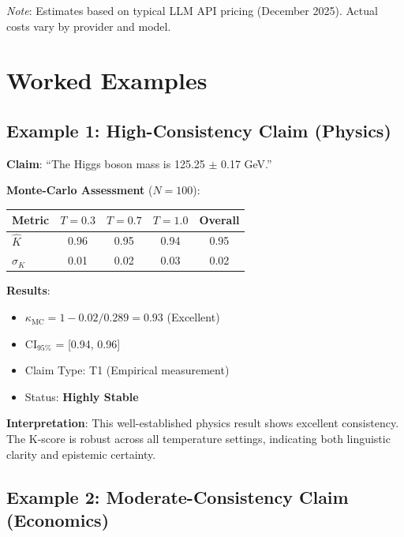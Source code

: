 \documentclass[11pt,a4paper]{article}
\theoremstyle{remark}
\begin{document}
\textit{Note}: Estimates based on typical LLM API pricing (December 2025). Actual costs vary by provider and model.


\section{Worked Examples}
\label{sec:examples}

\subsection{Example 1: High-Consistency Claim (Physics)}

\begin{examplebox}[title={Higgs Boson Mass}]
\textbf{Claim}: ``The Higgs boson mass is 125.25 $\pm$ 0.17 GeV.''

\textbf{Monte-Carlo Assessment} ($N = 100$):
\begin{center}
\begin{tabular}{lcccc}
\toprule
\textbf{Metric} & \textbf{$T=0.3$} & \textbf{$T=0.7$} & \textbf{$T=1.0$} & \textbf{Overall} \\
\midrule
$\hat{K}$ & 0.96 & 0.95 & 0.94 & 0.95 \\
$\sigma_K$ & 0.01 & 0.02 & 0.03 & 0.02 \\
\bottomrule
\end{tabular}
\end{center}

\textbf{Results}:
\begin{itemize}
    \item $\kappa_{\text{MC}} = 1 - 0.02/0.289 = 0.93$ (Excellent)
    \item CI$_{95\%}$ = [0.94, 0.96]
    \item Claim Type: T1 (Empirical measurement)
    \item Status: \textcolor{eslgreen}{\textbf{Highly Stable}}
\end{itemize}

\textbf{Interpretation}: This well-established physics result shows excellent consistency. The K-score is robust across all temperature settings, indicating both linguistic clarity and epistemic certainty.
\end{examplebox}

\subsection{Example 2: Moderate-Consistency Claim (Economics)}
\end{document}

